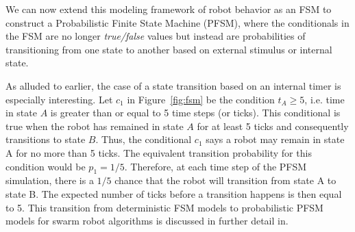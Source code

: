 \documentclass[Main.tex]{subfiles}
\begin{document}
We can now extend this modeling framework of robot behavior as an FSM to construct a Probabilistic Finite State Machine (PFSM), where the conditionals in the FSM are no longer \emph{true/false} values but instead are probabilities of transitioning from one state to another based on external stimulus or internal state. 

As alluded to earlier, the case of a state transition based on an internal timer is especially interesting. Let $c_1$ in Figure~\ref{fig:fsm} be the condition $t_A \geq 5$, i.e. time in state $A$ is greater than or equal to 5 time steps (or ticks). This conditional is true when the robot has remained in state $A$ for at least 5 ticks and consequently transitions to state $B$. Thus, the conditional $c_1$ says a robot may remain in state A for no more than 5 ticks. The equivalent transition probability for this condition would be $p_1 = 1/5$. Therefore, at each time step of the PFSM simulation, there is a $1/5$ chance that the robot will transition from state A to state B. The expected number of ticks before a transition happens is then equal to 5. This transition from deterministic FSM models to probabilistic PFSM models for swarm robot algorithms is discussed in further detail in\cite{Correll2008}.
 
\end{document}
